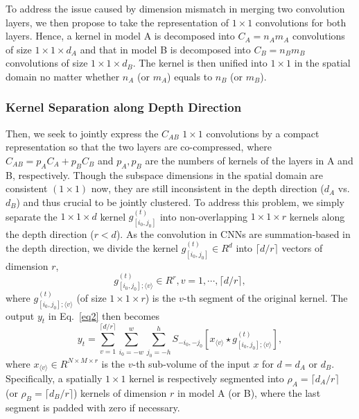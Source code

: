 \documentclass{article}
\begin{document}
	
	
	
	
	To address the issue caused by dimension mismatch in merging two convolution layers, we then propose to take the representation of $1 \times 1$ convolutions for both layers. %
	Hence, a kernel in model A is decomposed into $C_A=n_A m_A$ convolutions of size $1\times 1 \times d_A$ and that in model B is decomposed into $C_B=n_B m_B$ convolutions of size $1\times 1 \times d_B$.
	The kernel is then unified into $1 \times 1$ in the spatial domain no matter whether $n_A$ (or $m_A$) equals to $n_B$ (or $m_B$).
	
	\subsubsection{Kernel Separation along Depth Direction}
	Then, we seek to jointly express the $C_{AB}$ $1 \times 1$ convolutions by a compact representation so that the two layers are co-compressed, where $C_{AB}=p_A C_A+p_B C_B$ and $p_A, p_B$ are the numbers of kernels of the layers in A and B, respectively.
	Though the subspace dimensions in the spatial domain are consistent $(1\times 1)$ now, they are still inconsistent in the depth direction ($d_A$ vs.~$d_B$) and thus crucial to be jointly clustered.
	To address this problem, we simply separate the $1\times 1\times d$ kernel $g_{[i_0,j_0]}^{(t)}$ into non-overlapping $1\times 1\times r$ kernels along the depth direction ($r<d$).
	As the convolution in CNNs are summation-based in the depth direction, we divide the kernel $g_{[i_0,j_0]}^{(t)}\in R^d$ into $\lceil d/r \rceil$ vectors of dimension $r$,
	\begin{equation}
	\label{eq7}
	g_{[i_0,j_0];\langle v \rangle}^{(t)}\in R^r, v=1, \cdots, \lceil d/r \rceil,
	\end{equation}
	where $g_{[i_0,j_0];\langle v \rangle}^{(t)}$ (of size $1\times 1\times r$) is the $v$-th segment of the original kernel.
	The output $y_t$ in Eq.~\ref{eq2} then becomes
	\begin{equation}
	\label{eq8}
	y_t =\sum_{v=1}^{\lceil d/r \rceil}\sum_{i_0=-w}^{w}\sum_{j_0=-h}^{h} S_{-i_0, -j_0}[x_{\langle v \rangle} \star g_{[i_0,j_0];\langle v \rangle}^{(t)}],
	\end{equation}
	where $x_{\langle v \rangle} \in R^{N\times M \times r}$ is the $v$-th %
	sub-volume of the input $x$ for  $d=d_A$ or $d_B$.
	Specifically, a spatially $1\times 1$ kernel is respectively segmented into $\rho_A=\lceil d_A/r \rceil$ (or $\rho_B=\lceil d_B/r \rceil$) kernels of dimension $r$ in model A (or B), where the last segment is padded with zero if necessary.
	
\end{document}
